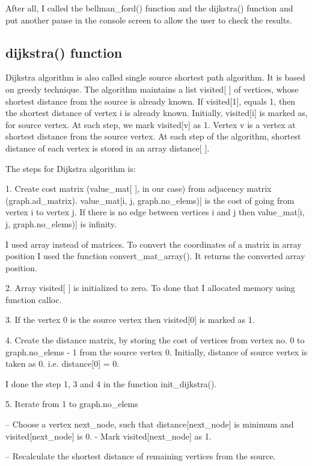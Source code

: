 \documentclass[12]{article}
\begin{document}
After all, I called the  bellman\_ford() function and the dijkstra() function and put another pause in the console screen to allow the user to check the results.

\subsection{dijkstra() function}
\textbf{}

Dijkstra algorithm is also called single source shortest path algorithm. It is based on greedy technique. The algorithm maintains a list visited[ ] of vertices, whose shortest distance from the source is already known.
 If visited[1], equals 1, then the shortest distance of vertex i is already known. Initially, visited[i] is marked as, for source vertex.
 At each step, we mark visited[v] as 1. Vertex v is a vertex at shortest distance from the source vertex. At each step of the algorithm, shortest distance of each vertex is stored in an array distance[ ].
 
 The steps for Dijkstra algorithm is:
 
 1. Create cost matrix (value\_mat[ ], in our case) from adjacency matrix (graph.ad\_matrix). value\_mat[i, j, graph.no\_elems)] is the cost of going from vertex i to vertex j. If there is no edge between vertices i and j then value\_mat[i, j, graph.no\_elems)] is infinity. 
 
 I used array instead of matrices. To convert the coordinates of a matrix in array position I used the function convert\_mat\_array(). It returns the converted array position. 
 
 2. Array visited[ ] is initialized to zero. To done that I allocated memory using function calloc.
 
 3. If the vertex 0 is the source vertex then visited[0] is marked as 1.
 
 4. Create the distance matrix, by storing the cost of vertices from vertex no. 0 to graph.no\_elems - 1 from the source vertex 0. Initially, distance of source vertex is taken as 0. i.e. distance[0] = 0.
 
 I done the step 1, 3 and 4 in the function init\_dijkstra().
 
 
 5. Iterate from 1 to graph.no\_elems
 
– Choose a vertex next\_node, such that distance[next\_node] is minimum and visited[next\_node] is 0. - Mark visited[next\_node] as 1.

– Recalculate the shortest distance of remaining vertices from the source.
\end{document}
